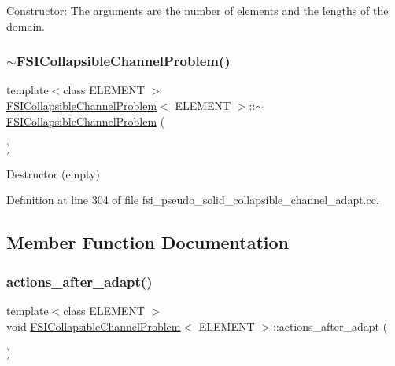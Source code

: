 Constructor\+: The arguments are the number of elements and the lengths of the domain. 

\mbox{\label{classFSICollapsibleChannelProblem_abe33aaaae15ea3eb10885527a1d1ad9a}} 
\subsubsection{\texorpdfstring{$\sim$\+F\+S\+I\+Collapsible\+Channel\+Problem()}{~FSICollapsibleChannelProblem()}\hspace{0.1cm}{\footnotesize\ttfamily [4/4]}}
{\footnotesize\ttfamily template$<$class E\+L\+E\+M\+E\+NT $>$ \\
\hyperlink{classFSICollapsibleChannelProblem}{F\+S\+I\+Collapsible\+Channel\+Problem}$<$ E\+L\+E\+M\+E\+NT $>$\+::$\sim$\hyperlink{classFSICollapsibleChannelProblem}{F\+S\+I\+Collapsible\+Channel\+Problem} (\begin{DoxyParamCaption}{ }\end{DoxyParamCaption})\hspace{0.3cm}{\ttfamily [inline]}}



Destructor (empty) 



Definition at line 304 of file fsi\+\_\+pseudo\+\_\+solid\+\_\+collapsible\+\_\+channel\+\_\+adapt.\+cc.



\subsection{Member Function Documentation}
\mbox{\label{classFSICollapsibleChannelProblem_ae20eb7ed895e0063ade5a6d0c6f9af2f}} 
\subsubsection{\texorpdfstring{actions\+\_\+after\+\_\+adapt()}{actions\_after\_adapt()}\hspace{0.1cm}{\footnotesize\ttfamily [1/2]}}
{\footnotesize\ttfamily template$<$class E\+L\+E\+M\+E\+NT $>$ \\
void \hyperlink{classFSICollapsibleChannelProblem}{F\+S\+I\+Collapsible\+Channel\+Problem}$<$ E\+L\+E\+M\+E\+NT $>$\+::actions\+\_\+after\+\_\+adapt (\begin{DoxyParamCaption}{ }\end{DoxyParamCaption})}



